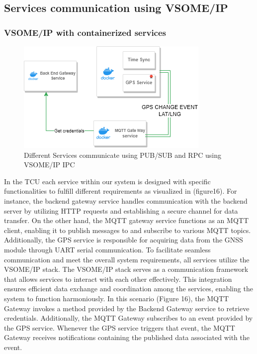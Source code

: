 \documentclass[
12pt,
oneside, 
onehalfspacing, 
nolistspacing, 
parskip, 
chapterinoneline, 
]{AASTCOMPUTER}
\begin{document}
\subsection{Services communication using VSOME/IP}
\subsubsection{VSOME/IP with containerized services}
\begin{figure}[!ht]
\centering
\includegraphics[scale=0.8]{Figures/22.png}
\caption[Different Services communicate using PUB/SUB and RPC using VSOME/IP IPC]{Different Services communicate using PUB/SUB and RPC using VSOME/IP IPC}
\label{fig:TCU}
\end{figure}
In the TCU each service within our system is designed with specific functionalities to fulfill different requirements as visualized in (figure16). For instance, the backend gateway service handles communication with the backend server by utilizing HTTP requests and establishing a secure channel for data transfer. On the other hand, the MQTT gateway service functions as an MQTT client, enabling it to publish messages to and subscribe to various MQTT topics. Additionally, the GPS service is responsible for acquiring data from the GNSS module through UART serial communication.
To facilitate seamless communication and meet the overall system requirements, all services utilize the VSOME/IP stack. The VSOME/IP stack serves as a communication framework that allows services to interact with each other effectively. This integration ensures efficient data exchange and coordination among the services, enabling the system to function harmoniously. 
In this scenario (Figure 16), the MQTT Gateway invokes a method provided by the Backend Gateway service to retrieve credentials. Additionally, the MQTT Gateway subscribes to an event provided by the GPS service. Whenever the GPS service triggers that event, the MQTT Gateway receives notifications containing the published data associated with the event.
\end{document}

